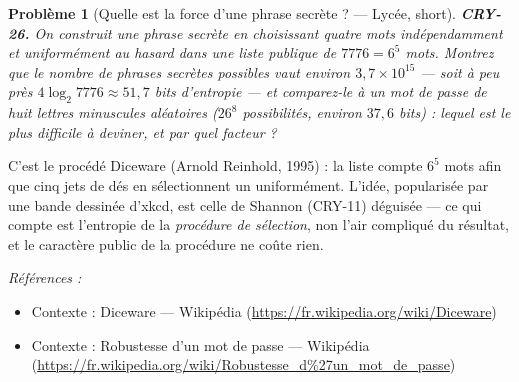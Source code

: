 \documentclass[11pt]{article}
\newtheorem{problem}{Problème}
\newenvironment{refs}{\par\small\noindent\emph{Références :}\begin{itemize}\setlength\itemsep{0pt}}{\end{itemize}\normalsize}
\begin{document}
\bigskip

\begin{problem}[{Quelle est la force d'une phrase secrète ? --- Lycée, short}]
\textbf{CRY-26.} On construit une phrase secrète en choisissant quatre
mots indépendamment et uniformément au hasard dans une liste publique de $7776 = 6^5$ mots.
Montrez que le nombre de phrases secrètes possibles vaut environ $3{,}7 \times 10^{15}$ ---
soit à peu près $4\log_2 7776 \approx 51{,}7$ bits d'entropie --- et comparez-le à un mot de
passe de huit lettres minuscules aléatoires ($26^8$ possibilités, environ
$37{,}6$ bits) : lequel est le plus difficile à deviner, et par quel facteur ?
\end{problem}

\noindent C'est le procédé Diceware (Arnold Reinhold, 1995) : la liste compte
$6^5$ mots afin que cinq jets de dés en sélectionnent un uniformément. L'idée, popularisée
par une bande dessinée d'xkcd, est celle de Shannon (CRY-11) déguisée --- ce qui compte est
l'entropie de la \textit{procédure de sélection}, non l'air compliqué du résultat, et le
caractère public de la procédure ne coûte rien.

\begin{refs}
\item Contexte : Diceware --- Wikipédia (\url{https://fr.wikipedia.org/wiki/Diceware})
\item Contexte : Robustesse d'un mot de passe --- Wikipédia (\url{https://fr.wikipedia.org/wiki/Robustesse_d%27un_mot_de_passe})
\end{refs}

\bigskip
\end{document}
